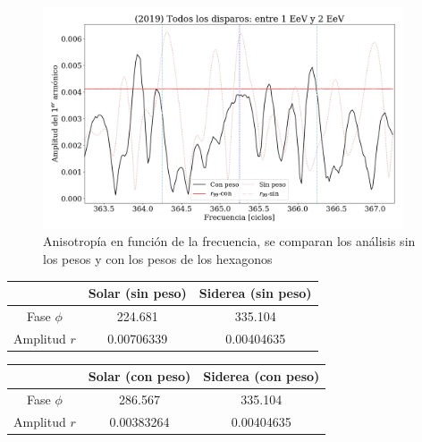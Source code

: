 		\begin{figure}[H]
			\centering
			\includegraphics[width=0.95\textwidth]{pesos_sin_con_1_2_EeV.png}
			\caption{Anisotropía en función de la frecuencia, se comparan los análisis sin los pesos y con los pesos de los hexagonos}
		\end{figure}
		
		
		\begin{table}
		\centering
		\begin{tabular}{c|c|c}
					& Solar (sin peso)		& Siderea (sin peso)  \\ \hline
		Fase $\phi$ & 224.681	    		& 335.104			\\
		Amplitud $r$& 0.00706339	    	&0.00404635			\\
		\end{tabular}
		
		\end{table}
		
		\begin{table}
		\centering
		\begin{tabular}{c|c|c}
					& Solar (con peso)		& Siderea (con peso)  \\ \hline
		Fase $\phi$ & 286.567	    	& 335.104			\\
		Amplitud $r$& 0.00383264	    &0.00404635			\\
		\end{tabular}
		\end{table}
		
		
		